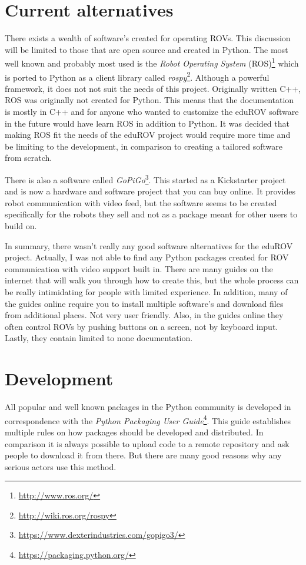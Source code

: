 \section{Current alternatives}

There exists a wealth of software's created for operating ROVs. This discussion will be limited to those that are open source and created in Python. The most well known and probably most used is the \emph{Robot Operating System} (ROS)\footnote{\url{http://www.ros.org/}} which is ported to Python as a client library called \emph{rospy}\footnote{\url{http://wiki.ros.org/rospy}}. Although a powerful framework, it does not not suit the needs of this project. Originally written C++, ROS was originally not created for Python. This means that the documentation is mostly in C++ and for anyone who wanted to customize the eduROV software in the future would have learn ROS in addition to Python. It was decided that making ROS fit the needs of the eduROV project would require more time and be limiting to the development, in comparison to creating a tailored software from scratch.

There is also a software called \emph{GoPiGo}\footnote{\url{https://www.dexterindustries.com/gopigo3/}}. This started as a Kickstarter project and is now a hardware and software project that you can buy online. It provides robot communication with video feed, but the software seems to be created specifically for the robots they sell and not as a package meant for other users to build on.

In summary, there wasn't really any good software alternatives for the eduROV project. Actually, I was not able to find any Python packages created for ROV communication with video support built in. There are many guides on the internet that will walk you through how to create this, but the whole process can be really intimidating for people with limited experience. In addition, many of the guides online require you to install multiple software's and download files from additional places. Not very user friendly. Also, in the guides online they often control ROVs by pushing buttons on a screen, not by keyboard input. Lastly, they contain limited to none documentation.

\section{Development}

All popular and well known packages in the Python community is developed in correspondence with the \emph{Python Packaging User Guide}\footnote{\url{https://packaging.python.org/}}. This guide establishes multiple rules on how packages should be developed and distributed. In comparison it is always possible to upload code to a remote repository and ask people to download it from there. But there are many good reasons why any serious actors use this method. 


